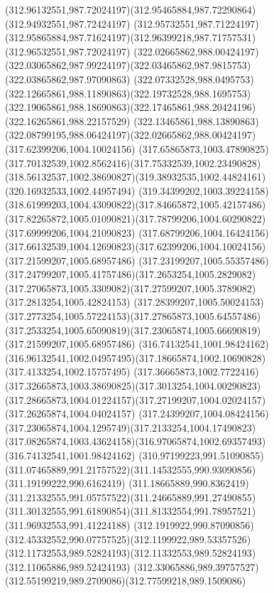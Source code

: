 {{		\curveto(312.96132551,987.72024197)(312.95465884,987.72290864)(312.94932551,987.72424197)
		\lineto(312.95732551,987.71224197)
		\curveto(312.95865884,987.71624197)(312.96399218,987.71757531)(312.96532551,987.72024197)
		\moveto(322.02665862,988.00424197)
		\curveto(322.03065862,987.99224197)(322.03465862,987.9815753)(322.03865862,987.97090863)
		\curveto(322.07332528,988.0495753)(322.12665861,988.11890863)(322.19732528,988.1695753)
		\curveto(322.19065861,988.18690863)(322.17465861,988.20424196)(322.16265861,988.22157529)
		\curveto(322.13465861,988.13890863)(322.08799195,988.06424197)(322.02665862,988.00424197)
		\moveto(317.62399206,1004.10024156)
		\curveto(317.65865873,1003.47890825)(317.70132539,1002.8562416)(317.75332539,1002.23490828)
		\curveto(318.56132537,1002.38690827)(319.38932535,1002.44824161)(320.16932533,1002.44957494)
		\curveto(319.34399202,1003.39224158)(318.61999203,1004.43090822)(317.84665872,1005.42157486)
		\curveto(317.82265872,1005.01090821)(317.78799206,1004.60290822)(317.69999206,1004.21090823)
		\curveto(317.68799206,1004.16424156)(317.66132539,1004.12690823)(317.62399206,1004.10024156)
		\moveto(317.21599207,1005.68957486)
		\curveto(317.23199207,1005.55357486)(317.24799207,1005.41757486)(317.2653254,1005.2829082)
		\curveto(317.27065873,1005.3309082)(317.27599207,1005.3789082)(317.2813254,1005.42824153)
		\curveto(317.28399207,1005.50024153)(317.2773254,1005.57224153)(317.27865873,1005.64557486)
		\curveto(317.2533254,1005.65090819)(317.23065874,1005.66690819)(317.21599207,1005.68957486)
		\moveto(316.74132541,1001.98424162)
		\curveto(316.96132541,1002.04957495)(317.18665874,1002.10690828)(317.4133254,1002.15757495)
		\curveto(317.36665873,1002.7722416)(317.32665873,1003.38690825)(317.3013254,1004.00290823)
		\curveto(317.28665873,1004.01224157)(317.27199207,1004.02024157)(317.26265874,1004.04024157)
		\curveto(317.24399207,1004.08424156)(317.23065874,1004.1295749)(317.2133254,1004.17490823)
		\curveto(317.08265874,1003.43624158)(316.97065874,1002.69357493)(316.74132541,1001.98424162)
		\moveto(310.97199223,991.51090855)
		\curveto(311.07465889,991.21757522)(311.14532555,990.93090856)(311.19199222,990.6162419)
		\curveto(311.18665889,990.8362419)(311.21332555,991.05757522)(311.24665889,991.27490855)
		\curveto(311.30132555,991.61890854)(311.81332554,991.78957521)(311.96932553,991.41224188)
		\curveto(312.1919922,990.87090856)(312.45332552,990.07757525)(312.1199922,989.53357526)
		\curveto(312.11732553,989.52824193)(312.11332553,989.52824193)(312.11065886,989.52424193)
		\curveto(312.33065886,989.39757527)(312.55199219,989.2709086)(312.77599218,989.1509086)
}}
